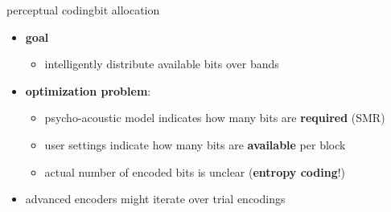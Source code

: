 	\begin{frame}{perceptual coding}{bit allocation}
        \begin{itemize}
            \item   \textbf{goal}
            \begin{itemize}
                \item   intelligently distribute available bits over bands 
            \end{itemize}
            \bigskip
            \item<2->   \textbf{optimization problem}:
                \begin{itemize}
                    \item   psycho-acoustic model indicates how many bits are \textbf{required} (SMR)
                    \smallskip
                    \item   user settings indicate how many bits are \textbf{available} per block
                    \smallskip
                    \item   actual number of encoded bits is unclear (\textbf{entropy coding}!)
                \end{itemize}
            \bigskip
            \item<3->   advanced encoders might iterate over trial encodings
        \end{itemize}
	\end{frame}
	
